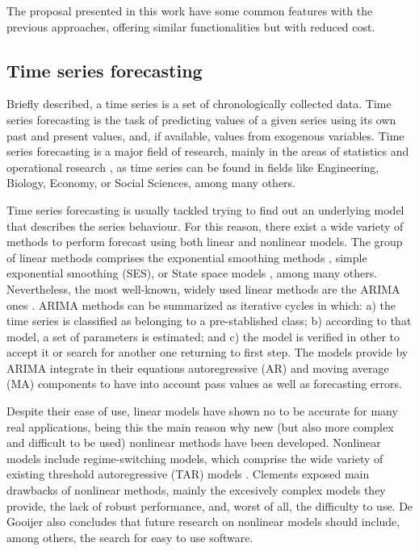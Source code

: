 \documentclass[preprint,authoryear,12pt]{elsarticle}
\begin{document}
The proposal presented in this work have some common features with the previous approaches, offering similar functionalities but with reduced cost.

\subsection{Time series forecasting}
\label{subsec:time-series}
Briefly described, a time series is a set of chronologically collected data. Time series forecasting is the task of predicting values of a given series using its own past and present values, and, if available, values from exogenous variables.
Time series forecasting is a major field of research, mainly in the areas of statistics \cite{Gooijer25years} and operational research \cite{Fildes2008}, as time series can be found in fields like Engineering, Biology, Economy, or Social Sciences, among many others.

Time series forecasting is usually tackled trying to find out an underlying model that describes the series behaviour. For this reason, there exist a wide variety of methods to perform forecast using both linear and nonlinear models. The group of linear methods comprises the exponential smoothing methods \cite{Brown1959,Winters1960}, simple exponential smoothing (SES), or State space models \cite{Snyder1985}, among many others. Nevertheless, the most well-known, widely used linear methods are the ARIMA ones \cite{BoxJenk}. ARIMA methods can be summarized as iterative cycles in which: a) the time series is classified as belonging to a pre-stablished class; b) according to that model, a set of parameters is estimated; and c) the model is verified in other to accept it or search for another one returning to first step. The models provide by ARIMA integrate in their equations autoregressive (AR) and moving average (MA) components to have into account pass values as well as forecasting errors.

Despite their ease of use, linear models have shown no to be accurate for many real applications, being this the main reason why new (but also more complex and difficult to be used) nonlinear methods have been developed. Nonlinear models include regime-switching models, which comprise the wide variety of existing threshold autoregressive (TAR) models \cite{Tong1978}. Clements \cite{Clements2004} exposed main drawbacks of nonlinear methods, mainly the excesively complex models they provide, the lack of robust performance, and, worst of all, the difficulty to use. De Gooijer \cite{Gooijer25years} also concludes that future research on nonlinear models should include, among others, the search for easy to use software.
\end{document}

